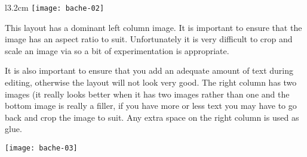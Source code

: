 \begin{kroll}
\begin{wrapfigure}{l}{3.2cm}
  \texttt{[image: bache-02]}
\end{wrapfigure}
This layout has a dominant left column image. It is important to
ensure that the image has an aspect ratio to suit. Unfortunately
it is very difficult to crop and scale an image via \tex so a bit
of experimentation is appropriate.

It is also important to ensure that you add an adequate amount
of text during editing, otherwise the layout will not look very good. The right
column has two images (it really looks better when it has two images rather than
one and the bottom image is really a filler, if you have more or less
text you may have to go back and crop the image to suit. Any extra space on the right column is used as glue.

\vfill
\texttt{[image: bache-03]}
\end{kroll}



\restoregeometry